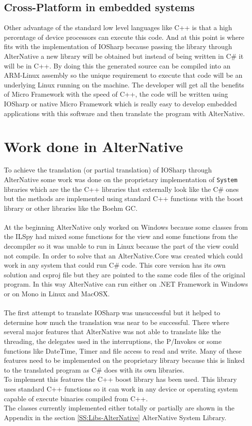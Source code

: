 \subsection{Cross-Platform in embedded systems}\label{SS:AN-Use-Cases-NETMF}
Other advantage of the standard low level languages like C++ is that a high percentage of device processors can execute this code. And at this point is where fits with the implementation of IOSharp because passing the library through AlterNative a new library will be obtained but instead of being written in C\# it will be in C++. By doing this the generated source can be compiled into an ARM-Linux assembly so the unique requirement to execute that code will be an underlying Linux running on the machine. The developer will get all the benefits of Micro Framework with the speed of C++, the code will be written using IOSharp or native Micro Framework which is really easy to develop embedded applications with this software and then translate the program with AlterNative.

\section{Work done in AlterNative}\label{AN-WorkDone}
To achieve the translation (or partial translation) of IOSharp through AlterNative some work was done on the proprietary implementation of \verb!System! libraries which are the the C++ libraries that externally look like the C\# ones but the methods are implemented using standard C++ functions with the boost library or other libraries like the Boehm GC.
\\
\\
At the beginning AlterNative only worked on Windows because some classes from the ILSpy had mixed some functions for the view and some functions from the decompiler so it was unable to run in Linux because the part of the view could not compile. In order to solve that an AlterNative.Core was created which could work in any system that could run C\# code. This core version has its own solution and csproj file but they are pointed to the same code files of the original program. In this way AlterNative can run either on .NET Framework in Windows or on Mono in Linux and MacOSX.
\\
\\
The first attempt to translate IOSharp was unsuccessful but it helped to determine how much the translation was near to be successful. There where several major features that AlterNative was not able to translate like the threading, the delegates used in the interruptions, the P/Invokes or some functions like DateTime, Timer and file access to read and write. Many of these features need to be implemented on the proprietary library because this is linked to the translated program as C\# does with its own libraries.
\\
To implement this features the C++ boost library has been used. This library uses standard C++ functions so it can work in any device or operating system capable of execute binaries compiled from C++.
\\
The classes currently implemented either totally or partially are shown in the Appendix in the section
\ref{SS:Libs-AlterNative} AlterNative System Library.

